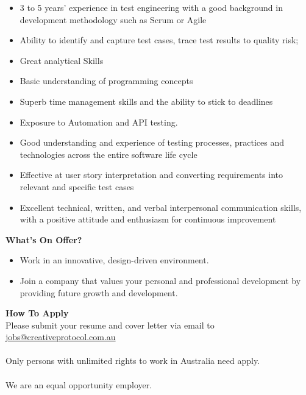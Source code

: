 \documentclass[11pt, oneside, a4paper, titlepage]{article}
\begin{document}
\begin{itemize}
    	\item 3 to 5 years' experience in test engineering with a good background in development methodology such as Scrum or Agile 

    	\item Ability to identify and capture test cases, trace test results to quality risk; 

    	\item Great analytical Skills 

    	\item Basic understanding of programming concepts 

    	\item Superb time management skills and the ability to stick to deadlines 

    	\item Exposure to Automation and API testing. 

    	\item Good understanding and experience of testing processes, practices and technologies across the entire software life cycle 

    	\item Effective at user story interpretation and converting requirements into relevant and specific test cases 

    	\item Excellent technical, written, and verbal interpersonal communication skills, with a positive attitude and enthusiasm for continuous improvement 
\end{itemize}
\hfill \break
\textbf{What's On Offer?}
\begin{itemize}
	\item Work in an innovative, design-driven environment. 
    	\item Join a company that values your personal and professional development by providing future growth and development.  
\end{itemize}
\hfill \break
\textbf{How To Apply}
\\
Please submit your resume and cover letter via email to \href{mailto:jobs@creativeprotocol.com.au}{jobs@creativeprotocol.com.au}
\\
\\
Only persons with unlimited rights to work in Australia need apply. 
\\
\\
We are an equal opportunity employer. 
\newpage
\end{document}
